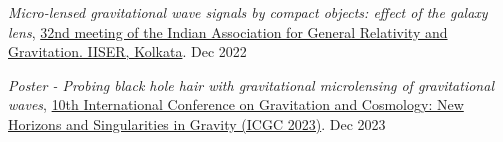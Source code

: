 \begin{itemize}[noitemsep]
{
\item \textit{Micro-lensed gravitational wave signals by compact objects: effect of the galaxy lens}, \href{https://www.iiserkol.ac.in/~iagrg32/}{32nd meeting of the Indian Association for General Relativity and Gravitation. IISER, Kolkata}. \hfill{Dec 2022}
\item \textit{Poster - Probing black hole hair with gravitational microlensing of gravitational waves}, \href{https://indico.cern.ch/event/1268737/registrations/participants}{10th International Conference on Gravitation and Cosmology: New Horizons and Singularities in Gravity (ICGC 2023)}. \hfill{Dec 2023}

}\end{itemize}
